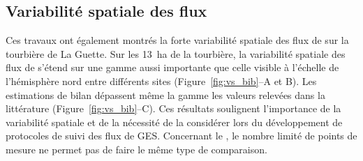 

%

\subsection*{Variabilité spatiale des flux}

Ces travaux ont également montrés la forte variabilité spatiale des flux de \coo sur la tourbière de La Guette.
Sur les \SI{13}{\hectare} de la tourbière, la variabilité spatiale des flux de \coo s'étend sur une gamme aussi importante que celle visible à l'échelle de l'hémisphère nord entre différents sites (Figure~\ref{fig:vs_bib}--A et B).
Les estimations de bilan dépassent même la gamme les valeurs relevées dans la littérature (Figure~\ref{fig:vs_bib}--C).
Ces résultats soulignent l'importance de la variabilité spatiale et de la nécessité de la considérer lors du développement de protocoles de suivi des flux de GES.
Concernant le \chh, le nombre limité de points de mesure ne permet pas de faire le même type de comparaison.

